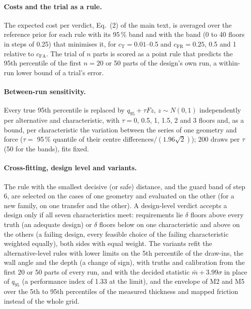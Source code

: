 \documentclass[pdflatex,sn-basic]{sn-jnl}
\begin{document}
\paragraph{Costs and the trial as a rule.} The expected cost per verdict, Eq.~(2) of the main text, is averaged over the reference prior for each rule with its 95\,\% band and with the band (0 to 40 floors in steps of 0.25) that minimises it, for $c_\mathrm{T}=0.01$--0.5 and $c_\mathrm{FR}=0.25$, 0.5 and 1 relative to $c_\mathrm{FA}$. The trial of $n$ parts is scored as a point rule that predicts the 95th percentile of the first $n=20$ or 50 parts of the design's own run, a within-run lower bound of a trial's error.

\paragraph{Between-run sensitivity.} Every true 95th percentile is replaced by $q_{95}+\tau F z$, $z\sim N(0,1)$ independently per alternative and characteristic, with $\tau=0$, 0.5, 1, 1.5, 2 and 3 floors and, as a bound, per characteristic the variation between the series of one geometry and force ($\tau=$ 95\,\% quantile of their centre differences$/(1.96\sqrt2)$); 200 draws per $\tau$ (50 for the bands), fits fixed.

\paragraph{Cross-fitting, design level and variants.} The rule with the smallest decisive (or safe) distance, and the guard band of step 6, are selected on the cases of one geometry and evaluated on the other (for a new family, on one transfer and the other). A design-level verdict accepts a design only if all seven characteristics meet: requirements lie $\delta$ floors above every truth (an adequate design) or $\delta$ floors below on one characteristic and above on the others (a failing design, every feasible choice of the failing characteristic weighted equally), both sides with equal weight. The variants refit the alternative-level rules with lower limits on the 5th percentile of the draw-ins, the wall angle and the depth (a change of sign), with truths and calibration from the first 20 or 50 parts of every run, and with the decided statistic $\bar m+3.99\sigma$ in place of $q_{95}$ (a performance index of 1.33 at the limit), and the envelope of M2 and M5 over the 5th to 95th percentiles of the measured thickness and mapped friction instead of the whole grid.
\end{document}
